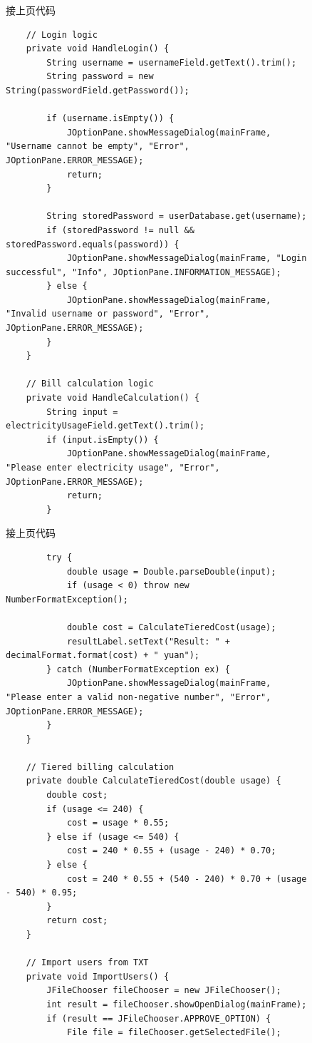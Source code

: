 \documentclass[12pt,a4paper]{article}
\begin{document}
\begin{figure}[H]
接上页代码
\begin{lstlisting}
    // Login logic
    private void HandleLogin() {
        String username = usernameField.getText().trim();
        String password = new String(passwordField.getPassword());

        if (username.isEmpty()) {
            JOptionPane.showMessageDialog(mainFrame, "Username cannot be empty", "Error", JOptionPane.ERROR_MESSAGE);
            return;
        }

        String storedPassword = userDatabase.get(username);
        if (storedPassword != null && storedPassword.equals(password)) {
            JOptionPane.showMessageDialog(mainFrame, "Login successful", "Info", JOptionPane.INFORMATION_MESSAGE);
        } else {
            JOptionPane.showMessageDialog(mainFrame, "Invalid username or password", "Error", JOptionPane.ERROR_MESSAGE);
        }
    }

    // Bill calculation logic
    private void HandleCalculation() {
        String input = electricityUsageField.getText().trim();
        if (input.isEmpty()) {
            JOptionPane.showMessageDialog(mainFrame, "Please enter electricity usage", "Error", JOptionPane.ERROR_MESSAGE);
            return;
        }
\end{lstlisting}
\end{figure}
\begin{figure}[H]
接上页代码
\begin{lstlisting}
        try {
            double usage = Double.parseDouble(input);
            if (usage < 0) throw new NumberFormatException();

            double cost = CalculateTieredCost(usage);
            resultLabel.setText("Result: " + decimalFormat.format(cost) + " yuan");
        } catch (NumberFormatException ex) {
            JOptionPane.showMessageDialog(mainFrame, "Please enter a valid non-negative number", "Error", JOptionPane.ERROR_MESSAGE);
        }
    }

    // Tiered billing calculation
    private double CalculateTieredCost(double usage) {
        double cost;
        if (usage <= 240) {
            cost = usage * 0.55;
        } else if (usage <= 540) {
            cost = 240 * 0.55 + (usage - 240) * 0.70;
        } else {
            cost = 240 * 0.55 + (540 - 240) * 0.70 + (usage - 540) * 0.95;
        }
        return cost;
    }

    // Import users from TXT
    private void ImportUsers() {
        JFileChooser fileChooser = new JFileChooser();
        int result = fileChooser.showOpenDialog(mainFrame);
        if (result == JFileChooser.APPROVE_OPTION) {
            File file = fileChooser.getSelectedFile();
\end{lstlisting}
\end{figure}
\end{document}
